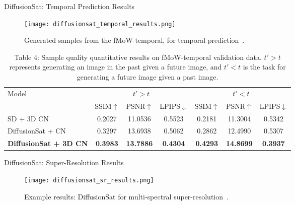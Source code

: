   \begin{refsection}
  \begin{frame}{DiffusionSat: Temporal Prediction Results}
    \begin{figure}
      \centering
      \texttt{[image: diffusionsat\_temporal\_results.png]}
      \caption[]{\scriptsize Generated samples from the fMoW-temporal, for temporal prediction~\parencite{diffusionset2024}.}
    \end{figure}
    \begin{table}[h]
      \centering
      \scriptsize
      \begin{tabular}{l|ccc|ccc}
        \toprule
        \multirow{2}{*}{Model} & \multicolumn{3}{c|}{$t' > t$} & \multicolumn{3}{c}{$t' < t$} \\
        & SSIM$\uparrow$ & PSNR$\uparrow$ & LPIPS$\downarrow$ & SSIM$\uparrow$ & PSNR$\uparrow$ & LPIPS$\downarrow$ \\
        \midrule
        SD + 3D CN & 0.2027 & 11.0536 & 0.5523 & 0.2181 & 11.3004 & 0.5342 \\
        DiffusionSat + CN & 0.3297 & 13.6938 & 0.5062 & 0.2862 & 12.4990 & 0.5307 \\
        \textbf{DiffusionSat + 3D CN} & \textbf{0.3983} & \textbf{13.7886} & \textbf{0.4304} & \textbf{0.4293} & \textbf{14.8699} & \textbf{0.3937} \\
        \bottomrule
      \end{tabular}
      \caption[]{\scriptsize Table 4: Sample quality quantitative results on fMoW-temporal validation data. $t' > t$ represents generating an image in the past given a future image, and $t' < t$ is the task for generating a future image given a past image.}
    \end{table}
    \bottomleftrefs
  \end{frame}
  \end{refsection}

    
  \begin{refsection}
  \begin{frame}{DiffusionSat: Super-Resolution Results}
    \begin{figure}
      \centering
      \texttt{[image: diffusionsat\_sr\_results.png]}
      \caption[]{\scriptsize Example results: DiffusionSat for multi-spectral super-resolution~\parencite{diffusionset2024}.}
    \end{figure}
    \bottomleftrefs
  \end{frame}
  \end{refsection}


